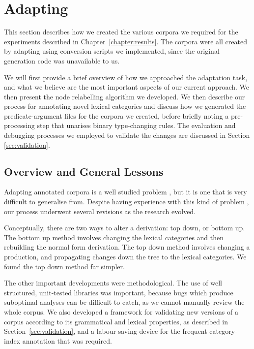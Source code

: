 \section{Adapting \ccgbank}

This section describes how we created the various corpora we required for the
experiments described in Chapter~\ref{chapter:results}. The corpora were all
created by adapting \ccgbank using conversion scripts we implemented, since the
original \ccgbank generation code was unavailable to us.

We will first provide a brief overview of how we approached the adaptation task,
and what we believe are the most important aspects of our current approach. We
then present the node relabelling algorithm we developed. We then describe our
process for annotating novel lexical categories and discuss how we generated the
predicate-argument files for the corpora we created, before briefly noting a
pre-processing step that unarises binary type-changing rules. The evaluation and
debugging processes we employed to validate the changes are discussed in Section
\ref{sec:validation}.

\subsection{Overview and General Lessons}

Adapting annotated corpora is a well studied problem
\citep{wang:94,lin:98,meyers:01,frank:03,miyao:04,shen:06,hock:cl07}, but it is
one that is very difficult to generalise from. Despite having experience with
this kind of problem
\citep{honnibal:04,honnibal:dlp07sfl,honnibal:pacling07prop}, our process
underwent several revisions as the research evolved. 

Conceptually, there are two ways to alter a \ccg derivation: top down, or bottom
up. The bottom up method involves changing the lexical categories and then
rebuilding the normal form derivation. The top down method involves changing a
production, and propagating changes down the tree to the lexical categories. We
found the top down method far simpler.

The other important developments were methodological. The use of well
structured, unit-tested libraries was important, because bugs which produce
suboptimal analyses can be difficult to catch, as we cannot manually review the
whole corpus. We also developed a framework for validating new versions of a
corpus according to its grammatical and lexical properties, as described in
Section~\ref{sec:validation}, and a labour saving device for the
frequent category-index annotation that was required.

